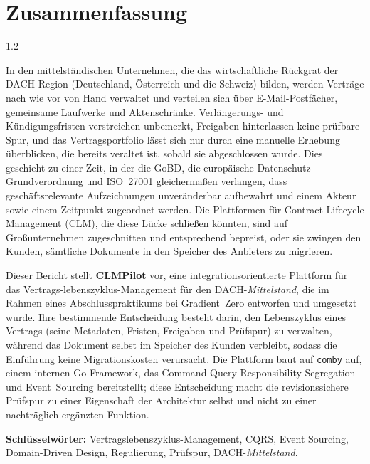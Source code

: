 \chapter*{Zusammenfassung}
\begin{spacing}{1.2}

In den mittelständischen Unternehmen, die das wirtschaftliche Rückgrat der
DACH-Region (Deutschland, Österreich und die Schweiz) bilden, werden Verträge
nach wie vor von Hand verwaltet und verteilen sich über E-Mail-Postfächer,
gemeinsame Laufwerke und Aktenschränke. Verlängerungs- und Kündigungsfristen
verstreichen unbemerkt, Freigaben hinterlassen keine prüfbare Spur, und das
Vertragsportfolio lässt sich nur durch eine manuelle Erhebung überblicken, die
bereits veraltet ist, sobald sie abgeschlossen wurde. Dies geschieht zu einer
Zeit, in der die GoBD, die europäische Datenschutz-Grundverordnung und
ISO~27001 gleichermaßen verlangen, dass geschäftsrelevante Aufzeichnungen
unveränderbar aufbewahrt und einem Akteur sowie einem Zeitpunkt zugeordnet
werden. Die Plattformen für Contract Lifecycle Management (CLM), die diese
Lücke schließen könnten, sind auf Großunternehmen zugeschnitten und
entsprechend bepreist, oder sie zwingen den Kunden, sämtliche Dokumente in den
Speicher des Anbieters zu migrieren.

Dieser Bericht stellt \textbf{CLMPilot} vor, eine integrationsorientierte
Plattform für das Vertrags-lebenszyklus-Management für den DACH-\textit{Mittelstand},
die im Rahmen eines Abschlusspraktikums bei Gradient~Zero entworfen und
umgesetzt wurde. Ihre bestimmende Entscheidung besteht darin, den Lebenszyklus
eines Vertrags (seine Metadaten, Fristen, Freigaben und Prüfspur) zu verwalten,
während das Dokument selbst im Speicher des Kunden verbleibt, sodass die
Einführung keine Migrationskosten verursacht. Die Plattform baut auf
\texttt{comby} auf, einem internen Go-Framework, das Command-Query
Responsibility Segregation und Event~Sourcing bereitstellt; diese Entscheidung
macht die revisionssichere Prüfspur zu einer Eigenschaft der Architektur selbst
und nicht zu einer nachträglich ergänzten Funktion.

\vspace{0.5cm}

\noindent\textbf{Schlüsselwörter:} Vertragslebenszyklus-Management, CQRS,
Event Sourcing, Domain-Driven Design, Regulierung, Prüfspur,
DACH-\textit{Mittelstand}.

\end{spacing}

